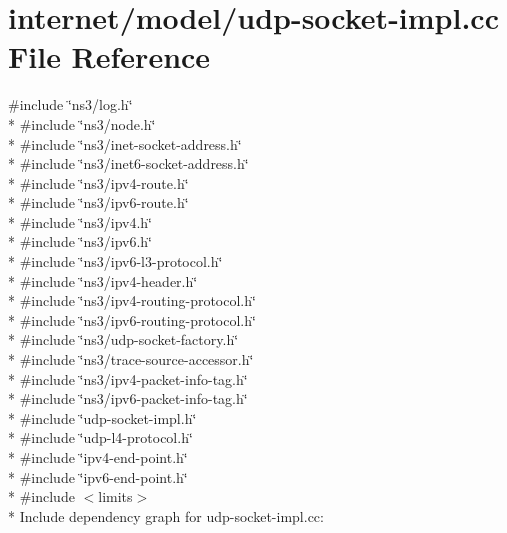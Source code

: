 \hypertarget{udp-socket-impl_8cc}{}\section{internet/model/udp-\/socket-\/impl.cc File Reference}
\label{udp-socket-impl_8cc}
{\ttfamily \#include \char`\"{}ns3/log.\+h\char`\"{}}\\*
{\ttfamily \#include \char`\"{}ns3/node.\+h\char`\"{}}\\*
{\ttfamily \#include \char`\"{}ns3/inet-\/socket-\/address.\+h\char`\"{}}\\*
{\ttfamily \#include \char`\"{}ns3/inet6-\/socket-\/address.\+h\char`\"{}}\\*
{\ttfamily \#include \char`\"{}ns3/ipv4-\/route.\+h\char`\"{}}\\*
{\ttfamily \#include \char`\"{}ns3/ipv6-\/route.\+h\char`\"{}}\\*
{\ttfamily \#include \char`\"{}ns3/ipv4.\+h\char`\"{}}\\*
{\ttfamily \#include \char`\"{}ns3/ipv6.\+h\char`\"{}}\\*
{\ttfamily \#include \char`\"{}ns3/ipv6-\/l3-\/protocol.\+h\char`\"{}}\\*
{\ttfamily \#include \char`\"{}ns3/ipv4-\/header.\+h\char`\"{}}\\*
{\ttfamily \#include \char`\"{}ns3/ipv4-\/routing-\/protocol.\+h\char`\"{}}\\*
{\ttfamily \#include \char`\"{}ns3/ipv6-\/routing-\/protocol.\+h\char`\"{}}\\*
{\ttfamily \#include \char`\"{}ns3/udp-\/socket-\/factory.\+h\char`\"{}}\\*
{\ttfamily \#include \char`\"{}ns3/trace-\/source-\/accessor.\+h\char`\"{}}\\*
{\ttfamily \#include \char`\"{}ns3/ipv4-\/packet-\/info-\/tag.\+h\char`\"{}}\\*
{\ttfamily \#include \char`\"{}ns3/ipv6-\/packet-\/info-\/tag.\+h\char`\"{}}\\*
{\ttfamily \#include \char`\"{}udp-\/socket-\/impl.\+h\char`\"{}}\\*
{\ttfamily \#include \char`\"{}udp-\/l4-\/protocol.\+h\char`\"{}}\\*
{\ttfamily \#include \char`\"{}ipv4-\/end-\/point.\+h\char`\"{}}\\*
{\ttfamily \#include \char`\"{}ipv6-\/end-\/point.\+h\char`\"{}}\\*
{\ttfamily \#include $<$limits$>$}\\*
Include dependency graph for udp-\/socket-\/impl.cc\+:
